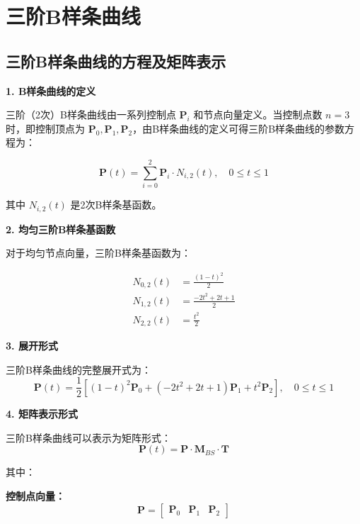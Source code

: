 \documentclass[12pt,a4paper]{article}
\begin{document}
\section{三阶B样条曲线}

\subsection{三阶B样条曲线的方程及矩阵表示}

\begin{tcolorbox}[breakable]
\textbf{1. B样条曲线的定义}

三阶（2次）B样条曲线由一系列控制点 $\mathbf{P}_i$ 和节点向量定义。当控制点数 $n=3$ 时，即控制顶点为 $\mathbf{P}_0, \mathbf{P}_1, \mathbf{P}_2$，由B样条曲线的定义可得三阶B样条曲线的参数方程为：

\begin{equation}
\mathbf{P}(t) = \sum_{i=0}^{2} \mathbf{P}_i \cdot N_{i,2}(t), \quad 0 \leq t \leq 1
\end{equation}

其中 $N_{i,2}(t)$ 是2次B样条基函数。

\textbf{2. 均匀三阶B样条基函数}

对于均匀节点向量，三阶B样条基函数为：

\begin{align}
N_{0,2}(t) &= \frac{(1-t)^2}{2} \\
N_{1,2}(t) &= \frac{-2t^2 + 2t + 1}{2} \\
N_{2,2}(t) &= \frac{t^2}{2}
\end{align}

\textbf{3. 展开形式}

三阶B样条曲线的完整展开式为：
\begin{equation}
\mathbf{P}(t) = \frac{1}{2}\left[(1-t)^2\mathbf{P}_0 + (-2t^2+2t+1)\mathbf{P}_1 + t^2\mathbf{P}_2\right], \quad 0 \leq t \leq 1
\end{equation}

\textbf{4. 矩阵表示形式}

三阶B样条曲线可以表示为矩阵形式：
\begin{equation}
\mathbf{P}(t) = \mathbf{P} \cdot \mathbf{M}_{BS} \cdot \mathbf{T}
\end{equation}

其中：

\textbf{控制点向量：}
\begin{equation}
\mathbf{P} = \begin{bmatrix} \mathbf{P}_0 & \mathbf{P}_1 & \mathbf{P}_2 \end{bmatrix}
\end{equation}


\end{tcolorbox}
\end{document}
